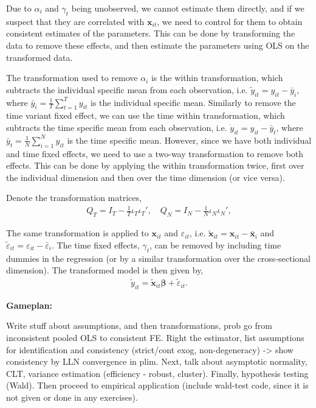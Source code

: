 Due to $\alpha_i$ and $\gamma_t$ being unobserved, we cannot estimate them directly, and if we suspect that they are correlated with $\bm{x}_{it}$, we need to control for them to obtain consistent estimates of the parameters. This can be done by transforming the data to remove these effects, and then estimate the parameters using OLS on the transformed data.

The transformation used to remove $\alpha_i$ is the within transformation, which subtracts the individual specific mean from each observation, i.e. $\tilde{y}_{it} = y_{it} - \bar{y}_i$, where $\bar{y}_i = \frac{1}{T} \sum_{t=1}^T y_{it}$ is the individual specific mean. Similarly to remove the time variant fixed effect, we can use the time within transformation, which subtracts the time specific mean from each observation, i.e. $\dot{y}_{it} = y_{it} - \bar{y}_t$, where $\bar{y}_t = \frac{1}{N} \sum_{i=1}^N y_{it}$ is the time specific mean. However, since we have both individual and time fixed effects, we need to use a two-way transformation to remove both effects. This can be done by applying the within transformation twice, first over the individual dimension and then over the time dimension (or vice versa). 

Denote the transformation matrices, 
\begin{align*}
    Q_T = I_T - \frac{1}{T} \iota_T \iota_T', \quad Q_N = I_N - \frac{1}{N} \iota_N \iota_N',
\end{align*}

The same transformation is applied to $\bm{x}_{it}$ and $\varepsilon_{it}$, i.e. $\tilde{\bm{x}}_{it} = \bm{x}_{it} - \bar{\bm{x}}_i$ and $\tilde{\varepsilon}_{it} = \varepsilon_{it} - \bar{\varepsilon}_i$. The time fixed effects, $\gamma_t$, can be removed by including time dummies in the regression (or by a similar transformation over the cross-sectional dimension). The transformed model is then given by, 
\begin{align*}
    \tilde{y}_{it} = \tilde{\bm{x}}_{it} \bm{\beta} + \tilde{\varepsilon}_{it}.
\end{align*}


\textbf{Gameplan:}

Write stuff about assumptions, and then transformations, prob go from inconsistent pooled OLS to consistent FE. Right the estimator, list assumptions for identification and consistency (strict/cont exog, non-degeneracy) -> show consistency by LLN convergence in plim. Next, talk about asymptotic normality, CLT, variance estimation (efficiency - robust, cluster). Finally, hypothesis testing (Wald). Then proceed to empirical application (include wald-test code, since it is not given or done in any exercises).


